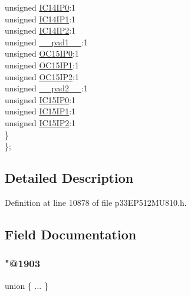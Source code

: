 \begin{DoxyCompactItemize}
\begin{tabbing}
\>\>unsigned \hyperlink{structtag_i_p_c34_b_i_t_s_a69eea5f2de595eb078724fda5b2662e3}{IC14IP0}:1\\
\>\>unsigned \hyperlink{structtag_i_p_c34_b_i_t_s_a6cd1ad5a037ccd2629e7cdcb28e8c696}{IC14IP1}:1\\
\>\>unsigned \hyperlink{structtag_i_p_c34_b_i_t_s_a32ec816031d79f9689f3937423567288}{IC14IP2}:1\\
\>\>unsigned \hyperlink{structtag_i_p_c34_b_i_t_s_acaf2d0924a107ec6e8d2e31febaf66f9}{\_\_pad1\_\_}:1\\
\>\>unsigned \hyperlink{structtag_i_p_c34_b_i_t_s_ab388063cc5adeefca3a99592d2dcc404}{OC15IP0}:1\\
\>\>unsigned \hyperlink{structtag_i_p_c34_b_i_t_s_a588b1bb9540047b95eca9705e1bbf026}{OC15IP1}:1\\
\>\>unsigned \hyperlink{structtag_i_p_c34_b_i_t_s_a567fffd20bf6b98fc989338fbe3e0e12}{OC15IP2}:1\\
\>\>unsigned \hyperlink{structtag_i_p_c34_b_i_t_s_a4d97cc5f7d51d22fc2bf3eab35c9cb7f}{\_\_pad2\_\_}:1\\
\>\>unsigned \hyperlink{structtag_i_p_c34_b_i_t_s_ad82db91790516357c13c92975000e97c}{IC15IP0}:1\\
\>\>unsigned \hyperlink{structtag_i_p_c34_b_i_t_s_afe05f64a3f9df6a385b13cbba07ece1e}{IC15IP1}:1\\
\>\>unsigned \hyperlink{structtag_i_p_c34_b_i_t_s_a71f824375a8092ae36665ac3143fd1bf}{IC15IP2}:1\\
\>\} \\
\}; \\

\end{tabbing}\end{DoxyCompactItemize}


\subsection{Detailed Description}


Definition at line 10878 of file p33\+E\+P512\+M\+U810.\+h.



\subsection{Field Documentation}
\mbox{\label{structtag_i_p_c34_b_i_t_s_a13cef8ae65aff9e5ac1e201f40b99238}} 
\subsubsection{\texorpdfstring{"@1903}{@1903}}
{\footnotesize\ttfamily union \{ ... \} }

